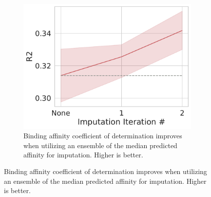 \documentclass[journal=jcisd8,manuscript=article]{achemso}
\begin{document}
\begin{figure}[tbph]
    \centering
    \begin{subfigure}[t]{0.48\textwidth}
        \centering
        \includegraphics[width=\linewidth]{figures/MedGOEnsR2.pdf}
        \caption{Binding affinity coefficient of determination improves when utilizing an ensemble of the median predicted affinity for imputation. Higher is better.}
    \end{subfigure}


\end{figure}
\end{document}
